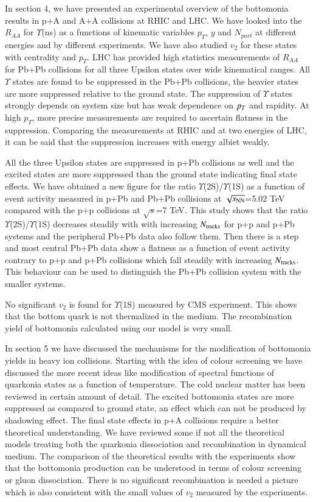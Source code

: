 In section 4, we have presented an experimental overview of the bottomonia
results in p+A and A+A collisions at RHIC and LHC. We have looked into the
$R_{AA}$ for $\Upsilon$(ns) as a functions of kinematic variables 
$p_T$, $y$ and $N_{part}$ at different energies and by different experiments. 
We have also studied $v_2$ for these states with centrality and $p_T$.
LHC has provided high statistics measurements of $R_{AA}$ for
Pb+Pb collisions for all three Upsilon states over wide kinematical ranges.
All $\Upsilon$ states are found to be suppressed in the Pb+Pb collisions,
the heavier states are more suppressed relative to the ground state.
The suppression of $\Upsilon$ states strongly depends on system size but
has weak dependence on $p_{T}$ and rapidity. At high $p_T$, more precise
measurements are required to ascertain flatness in the suppression. 
Comparing the measurements at RHIC and at two energies of LHC, it can be
said that the suppression increases with energy albiet weakly.

All the three Upsilon states are suppressed in p+Pb collisions as well
and the excited states are more suppressed than the ground state indicating
final state effects.
We have obtained a new figure for the ratio $\Upsilon$(2S)/$\Upsilon$(1S)
as a function of event activity measured in p+Pb and Pb+Pb collisions at
$\sqrt{s_{\rm NN}}$=5.02 TeV compared with the 
p+p collisions at $\sqrt{s}$=7 TeV. This study shows 
that the ratio $\Upsilon$(2S)/$\Upsilon$(1S) decreases steadily
with with increasing $N_{\rm tracks}$ for
p+p and p+Pb systems and the peripheral Pb+Pb data also follow them.
Then there is a step and most central Pb+Pb
data show a flatness as a function of event activity contrary to p+p and
p+Pb collisions which fall steadily with increasing $N_{\rm tracks}$.
This behaviour can be used to distinguish the Pb+Pb collision
system with the smaller systems.
 
No significant $v_2$ is found for $\Upsilon$(1S) measured by CMS
experiment. This shows that the bottom quark is not thermalized in the medium.
The recombination yield of bottomonia calculated using our model
is very small. 


In section 5 we have discussed the mechanisms for the modification of 
bottomonia yields in heavy ion collisions.
Starting with the idea of colour screening we have discussed the more recent
ideas like modification of spectral functions of quarkonia states as
a function of temperature.
The cold nuclear matter has been reviewed in certain amount of detail.
The excited bottomonia states are more suppressed as compared to ground state,
an effect which can not be produced by shadowing effect. The final state
effects in p+A collisions require a better theoretical understanding. 
We have reviewed some if not all the theoretical models treating both
the quarkonia dissociation and recombination in dynamical medium.
The comparison of the theoretical results with the experiments show that
the bottomonia production can be understood in terms of colour screening
or gluon dissociation. There is no significant recombination is needed
a picture which is also consistent with the small values of $v_2$ measured
by the experiments.

 

